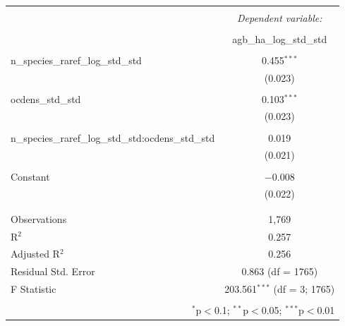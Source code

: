 
\begin{table}[!htbp] \centering 
  \caption{} 
  \label{soil_div_int_mod} 
\begin{tabular}{@{\extracolsep{5pt}}lc} 
\\[-1.8ex]\hline 
\hline \\[-1.8ex] 
 & \multicolumn{1}{c}{\textit{Dependent variable:}} \\ 
\cline{2-2} 
\\[-1.8ex] & agb\_ha\_log\_std\_std \\ 
\hline \\[-1.8ex] 
 n\_species\_raref\_log\_std\_std & 0.455$^{***}$ \\ 
  & (0.023) \\ 
  & \\ 
 ocdens\_std\_std & 0.103$^{***}$ \\ 
  & (0.023) \\ 
  & \\ 
 n\_species\_raref\_log\_std\_std:ocdens\_std\_std & 0.019 \\ 
  & (0.021) \\ 
  & \\ 
 Constant & $-$0.008 \\ 
  & (0.022) \\ 
  & \\ 
\hline \\[-1.8ex] 
Observations & 1,769 \\ 
R$^{2}$ & 0.257 \\ 
Adjusted R$^{2}$ & 0.256 \\ 
Residual Std. Error & 0.863 (df = 1765) \\ 
F Statistic & 203.561$^{***}$ (df = 3; 1765) \\ 
\hline 
\hline \\[-1.8ex] 
\multicolumn{2}{r}{$^{*}$p$<$0.1; $^{**}$p$<$0.05; $^{***}$p$<$0.01} \\ 
\end{tabular} 
\end{table} 
